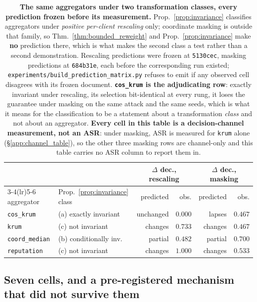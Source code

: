 \documentclass{article}
\begin{document}
\begin{table}[t]
\centering
\caption{\textbf{The same aggregators under two transformation classes, every prediction frozen before
its measurement.} Prop.~\ref{prop:invariance} classifies aggregators under \emph{positive per-client
rescaling} only; coordinate masking is outside that family, so Thm.~\ref{thm:bounded_reweight} and
Prop.~\ref{prop:invariance} make \textbf{no} prediction there, which is what makes the second class a
test rather than a second demonstration. Rescaling predictions were frozen at \texttt{5130cec},
masking predictions at \texttt{684b31e}, each before the corresponding run existed;
\texttt{experiments/build\_prediction\_matrix.py} refuses to emit if any observed cell disagrees with
its frozen document. \textbf{\texttt{cos\_krum} is the adjudicating row}: exactly invariant under
rescaling, its selection bit-identical at every rung, it loses the guarantee under masking on the same
attack and the same seeds, which is what it means for the classification to be a statement about a
transformation \emph{class} and not about an aggregator. \textbf{Every cell in this table is a
decision-channel measurement, not an ASR}: under masking, ASR is measured for \texttt{krum} alone
(§\ref{app:channel_table}), so the other three masking rows are channel-only and this table carries
no ASR column to report them in.}
\label{tab:prediction_matrix}
\small
\begin{tabular}{@{}llrrrr@{}}
\toprule
 & & \multicolumn{2}{c}{$\Delta$ dec., rescaling} & \multicolumn{2}{c}{$\Delta$ dec., masking} \\
\cmidrule(lr){3-4}\cmidrule(lr){5-6}
aggregator & Prop.~\ref{prop:invariance} class & predicted & obs. & predicted & obs. \\
\midrule
\texttt{cos\_krum} & (a) exactly invariant & unchanged & $0.000$ & lapses & $\mathbf{0.467}$ \\
\texttt{krum} & (c) not invariant & changes & $0.733$ & changes & $0.467$ \\
\texttt{coord\_median} & (b) conditionally inv. & partial & $0.482$ & partial & $0.700$ \\
\texttt{reputation} & (c) not invariant & changes & $1.000$ & changes & $0.533$ \\
\bottomrule
\end{tabular}
\end{table}


\subsection{Seven cells, and a pre-registered mechanism that did not survive them}
\label{app:sixcell}
\end{document}
